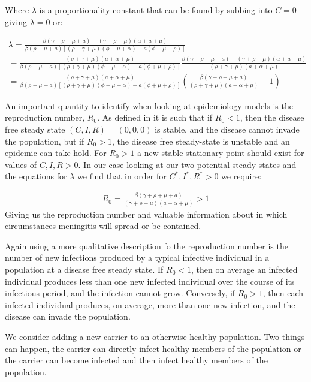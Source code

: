 \documentclass[11pt]{article} %
\begin{document}
	Where $ \lambda $ is a proportionality constant that can be found by subbing into $  \dot{C}=0 $ giving $ \lambda=0 $ or:
	
	\begin{eqnarray}
	\lambda=\frac{\beta(\gamma+\rho+\mu+a)-(\gamma+\rho+\mu)(\alpha+a+\mu)}{\beta(\rho+\mu+a)[(\rho+\gamma+\mu)(\phi+\mu+\alpha)+a(\phi+\mu+\rho)]}\\
	=\frac{(\rho+\gamma+\mu)(a+\alpha+\mu)}{\beta(\rho+\mu+a)[(\rho+\gamma+\mu)(\phi+\mu+\alpha)+a(\phi+\mu+\rho)]}\frac{\beta(\gamma+\rho+\mu+a)-(\gamma+\rho+\mu)(\alpha+a+\mu)}{(\rho+\gamma+\mu)(a+\alpha+\mu)}\\
	=\frac{(\rho+\gamma+\mu)(a+\alpha+\mu)}{\beta(\rho+\mu+a)[(\rho+\gamma+\mu)(\phi+\mu+\alpha)+a(\phi+\mu+\rho)]}\left( \frac{\beta(\gamma+\rho+\mu+a)}{(\rho+\gamma+\mu)(a+\alpha+\mu)}-1\right) 
	\end{eqnarray}
	
	
	An important quantity to identify when looking at epidemiology models is the reproduction number,  $  R_0 $. As defined in \cite{VanDenDriessche} it is such that if $ R_0 < 1 $, then the disease free  steady state $ (C,I,R)=(0,0,0) $ is stable, and the disease cannot invade the population, but if $  R_0 > 1 $, the disease free steady-state is unstable and an epidemic can take hold. 
	For $ R_0>1 $ a new stable stationary point should exist for values of $ C,I,R>0 $.
	In our case looking at our two potential steady states and the equations for $\lambda$ we find that in order for $C^*, I^*, R^*>0$ we require: 
	
	\begin{eqnarray}
	R_0=\frac{\beta(\gamma+\rho+\mu+a)}{(\gamma+\rho+\mu)(a+\alpha+\mu )}>1
	\end{eqnarray}
	Giving us the reproduction number and valuable information about in which circumstances meningitis will spread or be contained. 
	
Again using \cite{VanDenDriessche}  a more qualitative description fo the reproduction number is  the number of new infections produced by a typical infective individual in a population at a disease free steady state.  If $ R_0 < 1 $, then on average an infected individual produces less than one new infected	individual over the course of its infectious period, and the infection cannot grow. Conversely, if 	$ R_0 > 1 $, then each infected individual produces, on average, more than one new infection, and the disease can invade the population. 


We consider adding a new carrier to an otherwise healthy population. Two things can happen, the carrier can directly infect healthy members of the population or the carrier can become infected and then infect healthy members of the population. 
\end{document}
